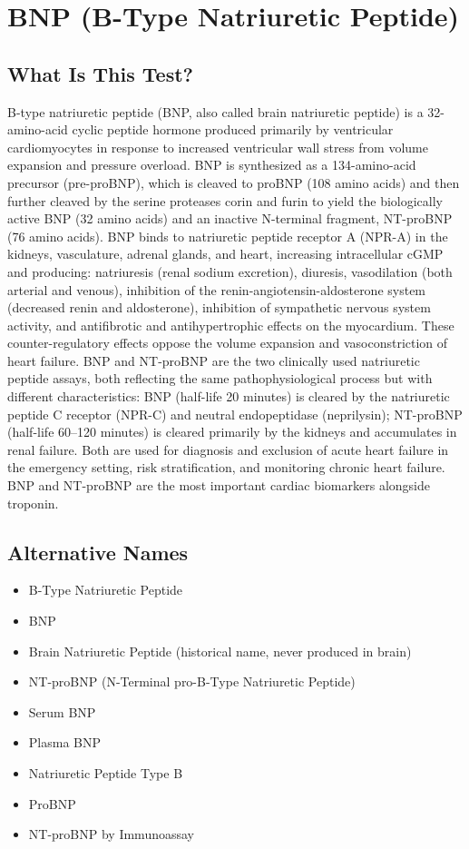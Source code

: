 \chapter{BNP (B-Type Natriuretic Peptide)}

\section*{What Is This Test?}
B-type natriuretic peptide (BNP, also called brain natriuretic peptide) is a 32-amino-acid cyclic peptide hormone produced primarily by ventricular cardiomyocytes in response to increased ventricular wall stress from volume expansion and pressure overload. BNP is synthesized as a 134-amino-acid precursor (pre-proBNP), which is cleaved to proBNP (108 amino acids) and then further cleaved by the serine proteases corin and furin to yield the biologically active BNP (32 amino acids) and an inactive N-terminal fragment, NT-proBNP (76 amino acids). BNP binds to natriuretic peptide receptor A (NPR-A) in the kidneys, vasculature, adrenal glands, and heart, increasing intracellular cGMP and producing: natriuresis (renal sodium excretion), diuresis, vasodilation (both arterial and venous), inhibition of the renin-angiotensin-aldosterone system (decreased renin and aldosterone), inhibition of sympathetic nervous system activity, and antifibrotic and antihypertrophic effects on the myocardium. These counter-regulatory effects oppose the volume expansion and vasoconstriction of heart failure. BNP and NT-proBNP are the two clinically used natriuretic peptide assays, both reflecting the same pathophysiological process but with different characteristics: BNP (half-life 20 minutes) is cleared by the natriuretic peptide C receptor (NPR-C) and neutral endopeptidase (neprilysin); NT-proBNP (half-life 60--120 minutes) is cleared primarily by the kidneys and accumulates in renal failure. Both are used for diagnosis and exclusion of acute heart failure in the emergency setting, risk stratification, and monitoring chronic heart failure. BNP and NT-proBNP are the most important cardiac biomarkers alongside troponin.

\section*{Alternative Names}
\begin{itemize}
  \item B-Type Natriuretic Peptide
  \item BNP
  \item Brain Natriuretic Peptide (historical name, never produced in brain)
  \item NT-proBNP (N-Terminal pro-B-Type Natriuretic Peptide)
  \item Serum BNP
  \item Plasma BNP
  \item Natriuretic Peptide Type B
  \item ProBNP
  \item NT-proBNP by Immunoassay
\end{itemize}
